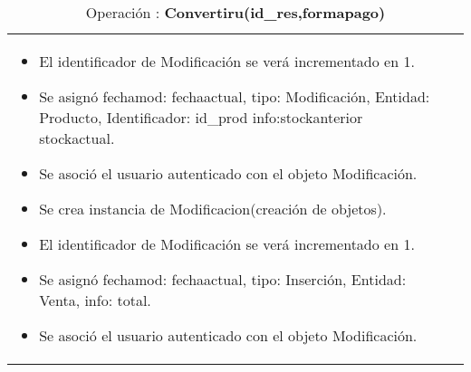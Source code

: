 \begin{table}[!h]
\begin{tabular}{|m{4cm}|m{12cm}|}
\begin{itemize}
\item El identificador de Modificación se verá incrementado en 1. 
\item Se asignó fechamod: fechaactual, tipo: Modificación, Entidad: Producto, Identificador: id\_prod info:stockanterior stockactual. 
\item Se asoció el usuario autenticado con el objeto Modificación.
\item Se crea instancia de Modificacion(creación de objetos). 
\item El identificador de Modificación se verá incrementado en 1. 
\item Se asignó fechamod: fechaactual, tipo: Inserción, Entidad: Venta, info: total. 
\item Se asoció el usuario autenticado con el objeto Modificación.
\end{itemize}\\
\end{tabular}
\caption{Operación : \textbf{Convertiru(id\_res,formapago)}} %
\end{table}

\clearpage

